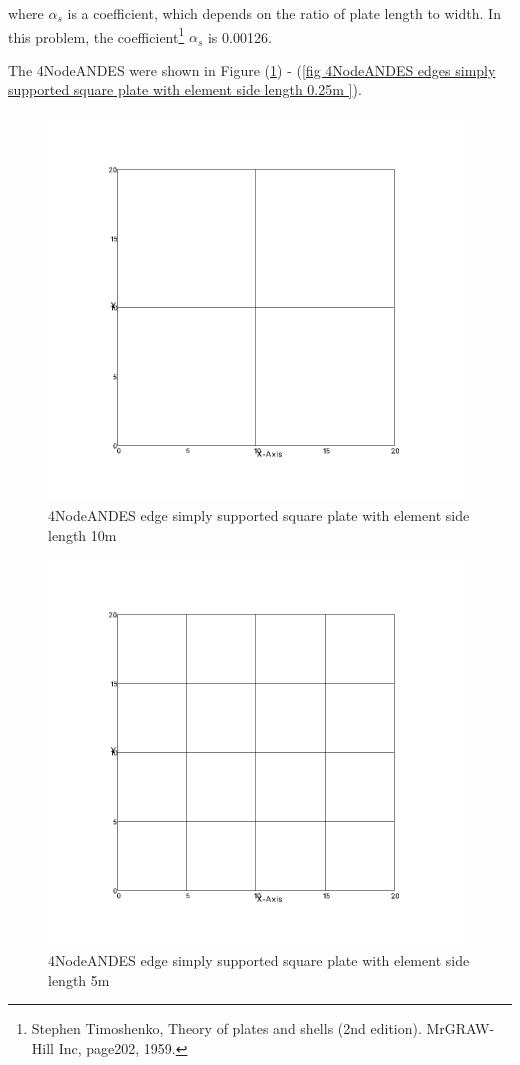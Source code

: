 \documentclass[fleqn,11pt,letter]{article}
\begin{document}
where $\alpha_s$ is a coefficient, which depends on the ratio of plate length to width. In this problem, the coefficient\footnote{Stephen Timoshenko, Theory of plates and shells (2nd edition). MrGRAW-Hill Inc, page202, 1959.} $\alpha_s$ is 0.00126.

The 4NodeANDES were shown in Figure (\ref{fig 4NodeANDES edges simply supported square plate with element side length 10m }) - (\ref{fig 4NodeANDES edges simply supported square plate with element side length 0.25m }). 



\begin{figure}[H]
  \centering
  \includegraphics[width=11cm]{../Figure_files/4NodeANDES/square_plate1.png}
  \caption{4NodeANDES edge simply supported square plate with element side length 10m }
  \label{fig 4NodeANDES edges simply supported square plate with element side length 10m }
\end{figure}

\newpage

\begin{figure}[H]
  \centering
  \includegraphics[width=11cm]{../Figure_files/4NodeANDES/square_plate2.png}
  \caption{4NodeANDES edge simply supported square plate with element side length 5m }
  \label{fig 4NodeANDES edges simply supported square plate with element side length 5m }
\end{figure}
\end{document}
